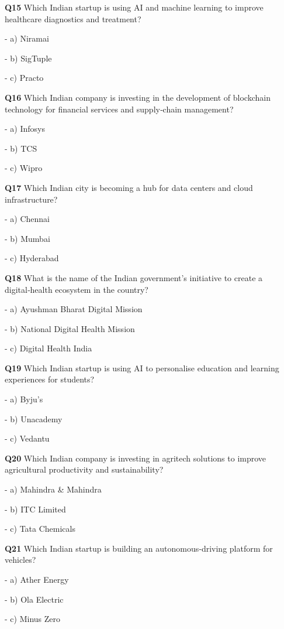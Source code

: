 \textbf{Q15} Which Indian startup is using AI and machine learning to improve healthcare diagnostics and treatment?\par
\quad - a) Niramai\par
\quad - b) SigTuple\par
\quad - c) Practo\par

\textbf{Q16} Which Indian company is investing in the development of blockchain technology for financial services and supply‑chain management?\par
\quad - a) Infosys\par
\quad - b) TCS\par
\quad - c) Wipro\par

\textbf{Q17} Which Indian city is becoming a hub for data centers and cloud infrastructure?\par
\quad - a) Chennai\par
\quad - b) Mumbai\par
\quad - c) Hyderabad\par

\textbf{Q18} What is the name of the Indian government's initiative to create a digital‑health ecosystem in the country?\par
\quad - a) Ayushman Bharat Digital Mission\par
\quad - b) National Digital Health Mission\par
\quad - c) Digital Health India\par

\textbf{Q19} Which Indian startup is using AI to personalise education and learning experiences for students?\par
\quad - a) Byju's\par
\quad - b) Unacademy\par
\quad - c) Vedantu\par

\textbf{Q20} Which Indian company is investing in agritech solutions to improve agricultural productivity and sustainability?\par
\quad - a) Mahindra & Mahindra\par
\quad - b) ITC Limited\par
\quad - c) Tata Chemicals\par

\textbf{Q21} Which Indian startup is building an autonomous‑driving platform for vehicles?\par
\quad - a) Ather Energy\par
\quad - b) Ola Electric\par
\quad - c) Minus Zero\par

